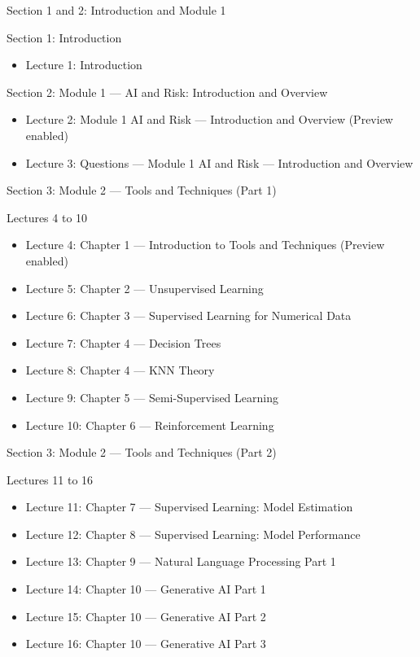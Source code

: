 \documentclass[aspectratio=169,11pt]{beamer}
\begin{document}
	\begin{frame}{Section 1 and 2: Introduction and Module 1}
		\begin{block}{Section 1: Introduction}
			\begin{itemize}
				\item Lecture 1: Introduction
			\end{itemize}
		\end{block}
		\begin{block}{Section 2: Module 1 --- AI and Risk: Introduction and Overview}
			\begin{itemize}
				\item Lecture 2: Module 1 AI and Risk --- Introduction and Overview (Preview enabled)
				\item Lecture 3: Questions --- Module 1 AI and Risk --- Introduction and Overview
			\end{itemize}
		\end{block}
	\end{frame}
	
	\begin{frame}{Section 3: Module 2 --- Tools and Techniques (Part 1)}
		\begin{block}{Lectures 4 to 10}
			\begin{itemize}
				\item Lecture 4: Chapter 1 --- Introduction to Tools and Techniques (Preview enabled)
				\item Lecture 5: Chapter 2 --- Unsupervised Learning
				\item Lecture 6: Chapter 3 --- Supervised Learning for Numerical Data
				\item Lecture 7: Chapter 4 --- Decision Trees
				\item Lecture 8: Chapter 4 --- KNN Theory
				\item Lecture 9: Chapter 5 --- Semi-Supervised Learning
				\item Lecture 10: Chapter 6 --- Reinforcement Learning
			\end{itemize}
		\end{block}
	\end{frame}
	
	\begin{frame}{Section 3: Module 2 --- Tools and Techniques (Part 2)}
		\begin{block}{Lectures 11 to 16}
			\begin{itemize}
				\item Lecture 11: Chapter 7 --- Supervised Learning: Model Estimation
				\item Lecture 12: Chapter 8 --- Supervised Learning: Model Performance
				\item Lecture 13: Chapter 9 --- Natural Language Processing Part 1
				\item Lecture 14: Chapter 10 --- Generative AI Part 1
				\item Lecture 15: Chapter 10 --- Generative AI Part 2
				\item Lecture 16: Chapter 10 --- Generative AI Part 3
			\end{itemize}
		\end{block}
	\end{frame}
	
\end{document}
